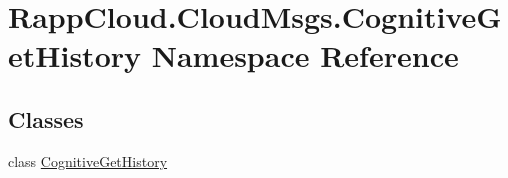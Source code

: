 \hypertarget{namespaceRappCloud_1_1CloudMsgs_1_1CognitiveGetHistory}{\section{Rapp\-Cloud.\-Cloud\-Msgs.\-Cognitive\-Get\-History Namespace Reference}
\label{namespaceRappCloud_1_1CloudMsgs_1_1CognitiveGetHistory}
}
\subsection*{Classes}
\begin{DoxyCompactItemize}
\item 
class \hyperlink{classRappCloud_1_1CloudMsgs_1_1CognitiveGetHistory_1_1CognitiveGetHistory}{Cognitive\-Get\-History}
\end{DoxyCompactItemize}
